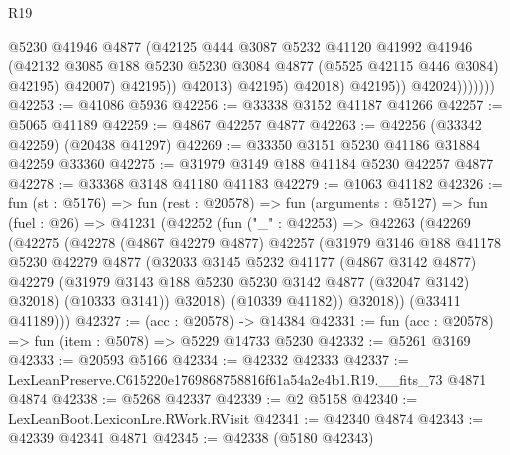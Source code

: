 \begin{lexlean}{R19}
\begin{coremodule}
                                @5230
                                @41946
                                @4877
                                (@42125
                                  @444
                                  @3087
                                  @5232
                                  @41120
                                  @41992
                                  @41946
                                  (@42132
                                    @3085
                                    @188
                                    @5230
                                    @5230
                                    @3084
                                    @4877
                                    (@5525 @42115 @446 @3084)
                                    @42195)
                                  @42007)
                                @42195))
                            @42013)
                          @42195)
                        @42018)
                      @42195))
                  @42024)))))))
@42253 := @41086 @5936
@42256 := @33338 @3152 @41187 @41266
@42257 := @5065 @41189
@42259 := @4867 @42257 @4877
@42263 := @42256 (@33342 @42259) (@20438 @41297)
@42269 := @33350 @3151 @5230 @41186 @31884 @42259 @33360
@42275 := @31979 @3149 @188 @41184 @5230 @42257 @4877
@42278 := @33368 @3148 @41180 @41183
@42279 := @1063 @41182
@42326 := fun (st : @5176) =>
  fun (rest : @20578) =>
  fun (arguments : @5127) =>
  fun (fuel : @26) =>
  @41231
    (@42252
      (fun ("_" : @42253) =>
      @42263
        (@42269
          (@42275
            (@42278
              (@4867 @42279 @4877)
              @42257
              (@31979
                @3146
                @188
                @41178
                @5230
                @42279
                @4877
                (@32033
                  @3145
                  @5232
                  @41177
                  (@4867 @3142 @4877)
                  @42279
                  (@31979 @3143 @188 @5230 @5230 @3142 @4877 (@32047 @3142) @32018)
                  (@10333 @3141))
                @32018)
              (@10339 @41182))
            @32018))
        (@33411 @41189)))
@42327 := (acc : @20578) -> @14384
@42331 := fun (acc : @20578) => fun (item : @5078) => @5229 @14733 @5230
@42332 := @5261 @3169
@42333 := @20593 @5166
@42334 := @42332 @42333
@42337 := LexLeanPreserve.C615220e1769868758816f61a54a2e4b1.R19.__fits_73 @4871 @4874
@42338 := @5268 @42337
@42339 := @2 @5158
@42340 := LexLeanBoot.LexiconLre.RWork.RVisit
@42341 := @42340 @4874
@42343 := @42339 @42341 @4871
@42345 := @42338 (@5180 @42343)

\end{coremodule}
\end{lexlean}
